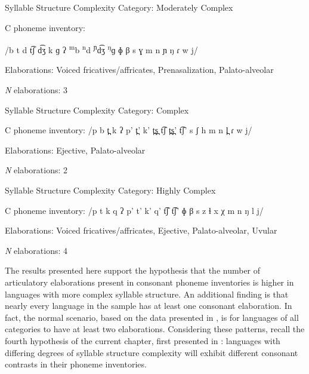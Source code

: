 \ea\label{ex:4.29}
\begin{Coding}
\item[Syllable Structure Complexity Category:] Moderately Complex

\item[C phoneme inventory:] \item[] /b t d t͡ʃ d͡ʒ k ɡ ʔ \textsuperscript{m}b \textsuperscript{n}d \textsuperscript{ɲ}d͡ʒ \textsuperscript{ŋ}ɡ ɸ β s ɣ m n ɲ ŋ ɾ w j/

\item[Elaborations:] Voiced fricatives/affricates, Prenasalization, Palato-alveolar

\item[\textit{N} elaborations:] 3
\end{Coding}
\z

\ea\label{ex:4.30}
\begin{Coding}
\item[Syllable Structure Complexity Category:] Complex

\item[C phoneme inventory:] /p b t̪ k ʔ p’ t̪’ k’ t̪s̪ t͡ʃ t̪s̪’ t͡ʃ’ s ʃ h m n l̪ ɾ w j/ 

\item[Elaborations:] Ejective, Palato-alveolar

\item[\textit{N} elaborations:] 2
\end{Coding}
\z

\ea\label{ex:4.31}
\begin{Coding}
\item[Syllable Structure Complexity Category:] Highly Complex

\item[C phoneme inventory:] /p t k q ʔ p’ t’ k’ q’ t͡ʃ t͡ʃ’ ɸ β s z ɬ x χ m n ŋ l j/

\item[Elaborations:] Voiced fricatives/affricates, Ejective, Palato-alveolar, Uvular 

\item[\textit{N} elaborations:] 4
\end{Coding}
\z

  The results presented here support the hypothesis that the number of articulatory elaborations present in consonant phoneme inventories is higher in languages with more complex syllable structure. An additional finding is that nearly every language in the sample has at least one consonant elaboration. In fact, the normal scenario, based on the data presented in , is for languages of all categories to have at least two elaborations. Considering these patterns, recall the fourth hypothesis of the current chapter, first presented in : languages with differing degrees of syllable structure complexity will exhibit different consonant contrasts in their phoneme inventories.

